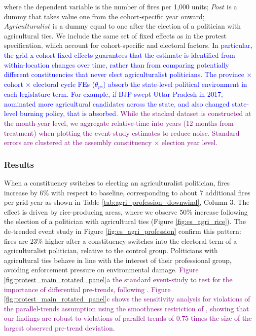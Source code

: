 \documentclass[12pt]{article}
\begin{document}
where the dependent variable is the number of fires per 1,000 units; $Post$ is a dummy that takes value one from the cohort-specific year onward; $Agriculturalist$ is a dummy equal to one after the election of a politician with agricultural ties. We include the same set of fixed effects as in the protest specification, which account for cohort-specific and electoral factors. \textcolor{blue}{In particular, the grid x cohort fixed effects guarantees that the estimate is identified from within-location changes over time, rather than from comparing potentially different constituencies that never elect agriculturalist politicians. The province × cohort × electoral cycle FEs ($\theta_{ps}$) absorb the state-level political environment in each legislature term. For example, if BJP swept Uttar Pradesh in 2017, nominated more agricultural candidates across the state, and also changed state-level burning policy, that is absorbed. 
}
 \textcolor{purple}{While the stacked dataset is constructed at the month-year level, we aggregate relative-time into years (12 months from treatment) when plotting the event-study estimates to reduce noise.
Standard errors are clustered at the assembly constituency $\times$ election year level. 
}

\subsubsection{Results\label{sssec:results3}}


When a constituency switches to electing an agriculturalist politician, fires increase by 6\% with respect to baseline, corresponding to about 7 additional fires per grid-year as shown in Table \ref{tab:agri_profession_downwind}, Column 3. The effect is driven by rice-producing areas, where we observe 50\% increase following the election of a politician with agricultural ties  (Figure \ref{fig:es_agri_rice}). The de-trended event study in Figure \ref{fig:es_agri_profession} confirm this pattern:  fires are 23\% higher after a constituency switches into the electoral term of a agriculturalist politician, relative to the control group. Politicians with agricultural ties behave in line with the interest of their professional group, avoiding enforcement pressure on environmental damage.
\textcolor{purple}{Figure \ref{fig:protest_main_rotated_panel}a the standard event-study to test for the importance of differential pre-trends, following \citet{dustmann2022reallocation}. Figure \ref{fig:protest_main_rotated_panel}c shows the sensitivity analysis for violations of the parallel-trends assumption using the smoothness restriction of \citet{rambachan2023more}, showing that our findings are robust to violations of parallel trends of 0.75 times the size of the largest observed pre-trend deviation.}
\end{document}

